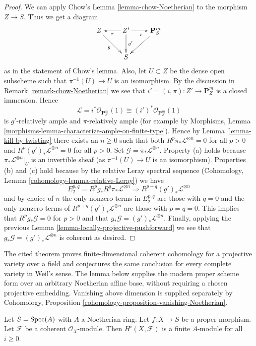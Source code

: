 \begin{proof}
\medskip\noindent
We can apply Chow's Lemma \ref{lemma-chow-Noetherian}
to the morphism $Z \to S$. Thus we get a diagram
$$
\xymatrix{
Z \ar[rd]_g & Z' \ar[d]^-{g'} \ar[l]^\pi \ar[r]_i & \mathbf{P}^m_S \ar[dl] \\
& S &
}
$$
as in the statement of Chow's lemma. Also, let $U \subset Z$ be
the dense open subscheme such that $\pi^{-1}(U) \to U$ is an isomorphism.
By the discussion in Remark \ref{remark-chow-Noetherian} we see that
$i' = (i, \pi) : Z' \to \mathbf{P}^m_Z$ is
a closed immersion. Hence
$$
\mathcal{L} = i^*\mathcal{O}_{\mathbf{P}^m_S}(1) \cong
(i')^*\mathcal{O}_{\mathbf{P}^m_Z}(1)
$$
is $g'$-relatively ample and $\pi$-relatively ample (for example by
Morphisms, Lemma \ref{morphisms-lemma-characterize-ample-on-finite-type}).
Hence by Lemma \ref{lemma-kill-by-twisting}
there exists an $n \geq 0$ such that
both $R^p\pi_*\mathcal{L}^{\otimes n} = 0$ for all $p > 0$ and
$R^p(g')_*\mathcal{L}^{\otimes n} = 0$ for all $p > 0$.
Set $\mathcal{G} = \pi_*\mathcal{L}^{\otimes n}$.
Property (a) holds because $\pi_*\mathcal{L}^{\otimes n}|_U$ is
an invertible sheaf (as $\pi^{-1}(U) \to U$ is an isomorphism).
Properties (b) and (c) hold because by the relative Leray
spectral sequence
(Cohomology, Lemma \ref{cohomology-lemma-relative-Leray})
we have
$$
E_2^{p, q} = R^pg_* R^q\pi_*\mathcal{L}^{\otimes n}
\Rightarrow
R^{p + q}(g')_*\mathcal{L}^{\otimes n}
$$
and by choice of $n$ the only nonzero terms in $E_2^{p, q}$ are
those with $q = 0$ and the only nonzero terms of
$R^{p + q}(g')_*\mathcal{L}^{\otimes n}$ are those with $p = q = 0$.
This implies that $R^pg_*\mathcal{G} = 0$ for $p > 0$ and
that $g_*\mathcal{G} = (g')_*\mathcal{L}^{\otimes n}$.
Finally, applying the previous
Lemma \ref{lemma-locally-projective-pushforward}
we see that $g_*\mathcal{G} = (g')_*\mathcal{L}^{\otimes n}$ is
coherent as desired.
\end{proof}

\begin{lemma}
\label{lemma-proper-over-affine-cohomology-finite}
\begin{reference}
\cite[Chapter III, \S 3, no. 66, Theorem 1 and following conjecture,
p. 259]{FAC}
\end{reference}
\begin{history}
The cited theorem proves finite-dimensional coherent cohomology for a
projective variety over a field and conjectures the same conclusion for every
complete variety in Weil's sense. The lemma below supplies the modern proper
scheme form over an arbitrary Noetherian affine base, without requiring a
chosen projective embedding. Vanishing above dimension is supplied separately
by Cohomology, Proposition
\ref{cohomology-proposition-vanishing-Noetherian}.
\end{history}
Let $S = \mathop{\mathrm{Spec}}(A)$ with $A$ a Noetherian ring.
Let $f : X \to S$ be a proper morphism.
Let $\mathcal{F}$ be a coherent $\mathcal{O}_X$-module.
Then $H^i(X, \mathcal{F})$ is a finite $A$-module for all $i \geq 0$.
\end{lemma}

